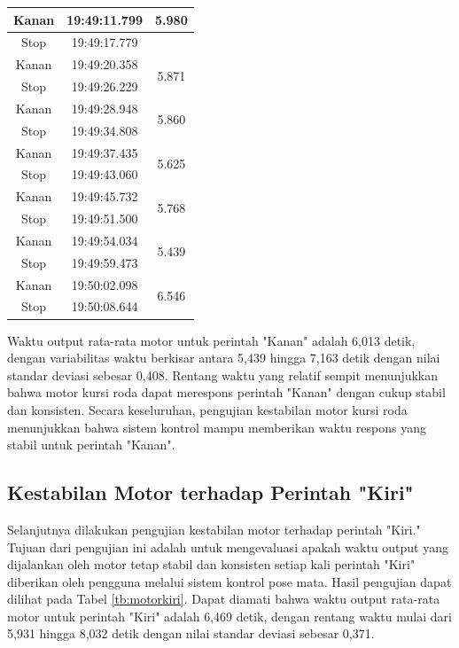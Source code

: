 \begin{longtable}{|c|c|c|}
  Kanan          & 19:49:11.799        & 5.980  \\ \hline
  Stop           & 19:49:17.779        &                         \\ \hline
  Kanan          & 19:49:20.358        & \multirow{2}{*}{5.871}  \\ \cline{1-2}
  Stop           & 19:49:26.229        &                         \\ \hline
  Kanan          & 19:49:28.948        & \multirow{2}{*}{5.860}  \\ \cline{1-2}
  Stop           & 19:49:34.808        &                         \\ \hline
  Kanan          & 19:49:37.435        & \multirow{2}{*}{5.625}  \\ \cline{1-2}
  Stop           & 19:49:43.060        &                         \\ \hline
  Kanan          & 19:49:45.732        & \multirow{2}{*}{5.768}  \\ \cline{1-2}
  Stop           & 19:49:51.500        &                         \\ \hline
  Kanan          & 19:49:54.034        & \multirow{2}{*}{5.439}  \\ \cline{1-2}
  Stop           & 19:49:59.473        &                         \\ \hline
  Kanan          & 19:50:02.098        & \multirow{2}{*}{6.546}  \\ \cline{1-2}
  Stop           & 19:50:08.644        &                         \\ \hline
\end{longtable}

Waktu output rata-rata motor untuk perintah "Kanan" adalah 6,013 detik, dengan variabilitas waktu berkisar antara 5,439 hingga 7,163 detik dengan nilai standar deviasi sebesar 0,408. Rentang waktu yang relatif sempit menunjukkan bahwa motor kursi roda dapat merespons perintah "Kanan" dengan cukup stabil dan konsisten. Secara keseluruhan, pengujian kestabilan motor kursi roda menunjukkan bahwa sistem kontrol mampu memberikan waktu respons yang stabil untuk perintah "Kanan".

\subsection{Kestabilan Motor terhadap Perintah "Kiri"}

Selanjutnya dilakukan pengujian kestabilan motor terhadap perintah "Kiri." Tujuan dari pengujian ini adalah untuk mengevaluasi apakah waktu output yang dijalankan oleh motor tetap stabil dan konsisten setiap kali perintah "Kiri" diberikan oleh pengguna melalui sistem kontrol pose mata. Hasil pengujian dapat dilihat pada Tabel \ref{tb:motorkiri}. Dapat diamati bahwa waktu output rata-rata motor untuk perintah "Kiri" adalah 6,469 detik, dengan rentang waktu mulai dari 5,931 hingga 8,032 detik dengan nilai standar deviasi sebesar 0,371.

